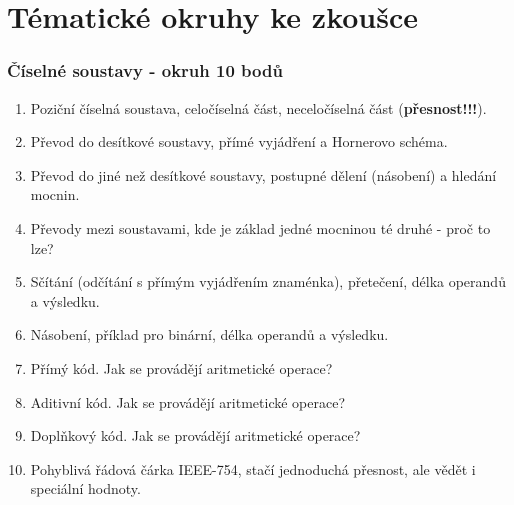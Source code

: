 \section{\texorpdfstring{Tématické okruhy ke zkoušce}{Tematicke okruhy ke zkousce}}

	\begin{frame}
    \frametitle{Číselné soustavy - okruh 10 bodů}
		\small
		\begin{enumerate}
			\item Poziční číselná soustava, celočíselná část, neceločíselná část (\textbf{přesnost!!!}).
			\item Převod do desítkové soustavy, přímé vyjádření a Hornerovo schéma.
			\item Převod do jiné než desítkové soustavy, postupné dělení (násobení) a hledání mocnin.
			\item Převody mezi soustavami, kde je základ jedné mocninou té druhé - proč to lze?
			\item Sčítání (odčítání s přímým vyjádřením znaménka), přetečení, délka operandů a výsledku.
			\item Násobení, příklad pro binární, délka operandů a výsledku.
			\item Přímý kód. Jak se provádějí aritmetické operace?
			\item Aditivní kód. Jak se provádějí aritmetické operace?
			\item Doplňkový kód. Jak se provádějí aritmetické operace?
			\item Pohyblivá řádová čárka IEEE-754, stačí jednoduchá přesnost, ale vědět i speciální hodnoty.
		\end{enumerate}
		
	\end{frame}

